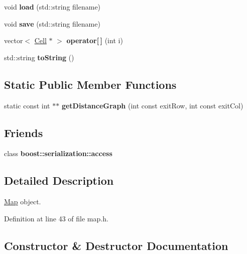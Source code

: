 \begin{DoxyCompactItemize}
void {\bfseries load} (std\+::string filename)
\item 
\hypertarget{class_map_a0b67e2b03238fd18ecab89d8369ca67b}{}\label{class_map_a0b67e2b03238fd18ecab89d8369ca67b} 
void {\bfseries save} (std\+::string filename)
\item 
\hypertarget{class_map_a8f2e95c92c3b1b36d9212b101d755bd8}{}\label{class_map_a8f2e95c92c3b1b36d9212b101d755bd8} 
vector$<$ \hyperlink{class_cell}{Cell} $\ast$ $>$ {\bfseries operator\mbox{[}$\,$\mbox{]}} (int i)
\item 
\hypertarget{class_map_a94c656e72ab63c3791c1f8522f56f603}{}\label{class_map_a94c656e72ab63c3791c1f8522f56f603} 
std\+::string {\bfseries to\+String} ()
\end{DoxyCompactItemize}
\subsection*{Static Public Member Functions}
\begin{DoxyCompactItemize}
\item 
\hypertarget{class_map_a5862ce4a3b20cb267fc19d4167aa3f05}{}\label{class_map_a5862ce4a3b20cb267fc19d4167aa3f05} 
static const int $\ast$$\ast$ {\bfseries get\+Distance\+Graph} (int const exit\+Row, int const exit\+Col)
\end{DoxyCompactItemize}
\subsection*{Friends}
\begin{DoxyCompactItemize}
\item 
\hypertarget{class_map_ac98d07dd8f7b70e16ccb9a01abf56b9c}{}\label{class_map_ac98d07dd8f7b70e16ccb9a01abf56b9c} 
class {\bfseries boost\+::serialization\+::access}
\end{DoxyCompactItemize}


\subsection{Detailed Description}
\hyperlink{class_map}{Map} object. 

Definition at line 43 of file map.\+h.



\subsection{Constructor \& Destructor Documentation}
\hypertarget{class_map_a0f5ad0fd4563497b4214038cbca8b582}{}\label{class_map_a0f5ad0fd4563497b4214038cbca8b582} 
